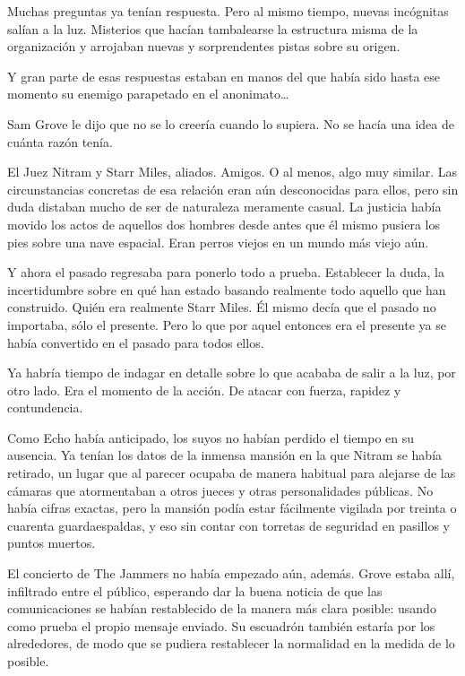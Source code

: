 Muchas preguntas ya tenían respuesta. Pero al mismo tiempo, nuevas incógnitas salían a la luz. Misterios que hacían tambalearse la estructura misma de la organización y arrojaban nuevas y sorprendentes pistas sobre su origen.

Y gran parte de esas respuestas estaban en manos del que había sido hasta ese momento su enemigo parapetado en el anonimato\dots

\fancyparbreak
Sam Grove le dijo que no se lo creería cuando lo supiera. No se hacía una idea de cuánta razón tenía.

El Juez Nitram y Starr Miles, aliados. Amigos. O al menos, algo muy similar. Las circunstancias concretas de esa relación eran aún desconocidas para ellos, pero sin duda distaban mucho de ser de naturaleza meramente casual. La justicia había movido los actos de aquellos dos hombres desde antes que él mismo pusiera los pies sobre una nave espacial. Eran perros viejos en un mundo más viejo aún.

Y ahora el pasado regresaba para ponerlo todo a prueba. Establecer la duda, la incertidumbre sobre en qué han estado basando realmente todo aquello que han construido. Quién era realmente Starr Miles. Él mismo decía que el pasado no importaba, sólo el presente. Pero lo que por aquel entonces era el presente ya se había convertido en el pasado para todos ellos.

Ya habría tiempo de indagar en detalle sobre lo que acababa de salir a la luz, por otro lado. Era el momento de la acción. De atacar con fuerza, rapidez y contundencia.

Como Echo había anticipado, los suyos no habían perdido el tiempo en su ausencia. Ya tenían los datos de la inmensa mansión en la que Nitram se había retirado, un lugar que al parecer ocupaba de manera habitual para alejarse de las cámaras que atormentaban a otros jueces y otras personalidades públicas. No había cifras exactas, pero la mansión podía estar fácilmente vigilada por treinta o cuarenta guardaespaldas, y eso sin contar con torretas de seguridad en pasillos y puntos muertos.

El concierto de The Jammers no había empezado aún, además. Grove estaba allí, infiltrado entre el público, esperando dar la buena noticia de que las comunicaciones se habían restablecido de la manera más clara posible: usando como prueba el propio mensaje enviado. Su escuadrón también estaría por los alrededores, de modo que se pudiera restablecer la normalidad en la medida de lo posible.

